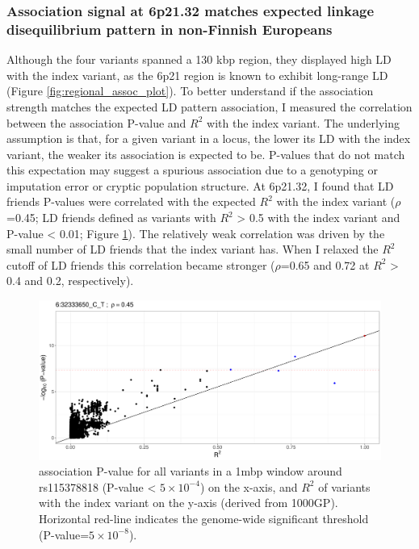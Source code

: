     \subsubsection{Association signal at 6p21.32 matches expected linkage disequilibrium pattern in non-Finnish Europeans}
    Although the four variants spanned a 130 kbp region, they displayed high LD with the index variant, as the 6p21 region is known to exhibit long-range LD (Figure \ref{fig:regional_assoc_plot}). To better understand if the association strength matches the expected LD pattern association, I measured the correlation between the association P-value and $R^{2}$ with the index variant. The underlying assumption is that, for a given variant in a locus, the lower its LD with the index variant, the weaker its association is expected to be. P-values that do not match this expectation may suggest a spurious association due to a genotyping or imputation error or cryptic population structure. At 6p21.32, I found that LD friends P-values were correlated with the expected $R^{2}$ with the index variant ($\rho$=0.45; LD friends defined as variants with $R^{2}$ > 0.5 with the index variant and P-value < 0.01; Figure \ref{fig:ld_pval_plot}). The relatively weak correlation was driven by the small number of LD friends that the index variant has. When I relaxed the $R^{2}$ cutoff of LD friends this correlation became stronger ($\rho$=0.65 and 0.72 at $R^{2}$ > 0.4 and 0.2, respectively). 




    \begin{figure}[H] 
      \centering    
      \includegraphics[width=1.0\textwidth]{fig3}
      \caption[Figure]{association P-value for all variants in a 1mbp window around rs115378818 (P-value < $5\times10^{-4}$) on the x-axis, and $R^{2}$ of variants with the index variant on the y-axis (derived from 1000GP). Horizontal red-line indicates the genome-wide significant threshold (P-value=$5\times10^{-8}$).}
      \label{fig:ld_pval_plot}
      \end{figure}


